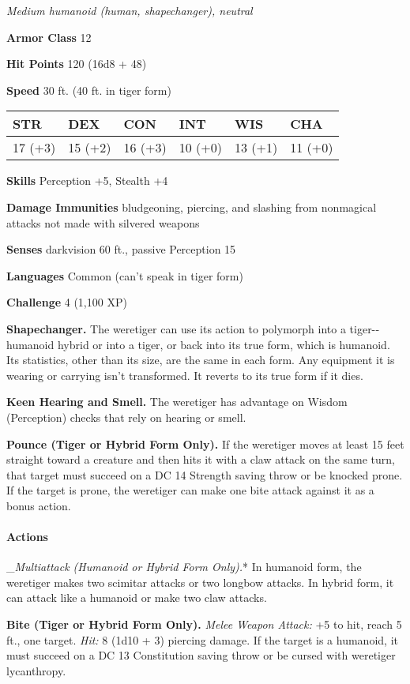 \documentclass[
]{article}
\begin{document}
\emph{Medium humanoid (human, shapechanger), neutral}

\textbf{Armor Class} 12

\textbf{Hit Points} 120 (16d8 + 48)

\textbf{Speed} 30 ft. (40 ft. in tiger form)

\begin{longtable}[]{@{}llllll@{}}
\toprule
STR & DEX & CON & INT & WIS & CHA\tabularnewline
\midrule
\endhead
17 (+3) & 15 (+2) & 16 (+3) & 10 (+0) & 13 (+1) & 11 (+0)\tabularnewline
\bottomrule
\end{longtable}

\textbf{Skills} Perception +5, Stealth +4

\textbf{Damage Immunities} bludgeoning, piercing, and slashing from
nonmagical attacks not made with silvered weapons

\textbf{Senses} darkvision 60 ft., passive Perception 15

\textbf{Languages} Common (can't speak in tiger form)

\textbf{Challenge} 4 (1,100 XP)

\textbf{Shapechanger.} The weretiger can use its action to polymorph
into a tiger-­‐humanoid hybrid or into a tiger, or back into its true
form, which is humanoid. Its statistics, other than its size, are the
same in each form. Any equipment it is wearing or carrying isn't
transformed. It reverts to its true form if it dies.

\textbf{Keen Hearing and Smell.} The weretiger has advantage on Wisdom
(Perception) checks that rely on hearing or smell.

\textbf{Pounce (Tiger or Hybrid Form Only).} If the weretiger moves at
least 15 feet straight toward a creature and then hits it with a claw
attack on the same turn, that target must succeed on a DC 14 Strength
saving throw or be knocked prone. If the target is prone, the weretiger
can make one bite attack against it as a bonus action.

\hypertarget{actions-6}{%
\paragraph{Actions}\label{actions-6}}

\_\emph{Multiattack (Humanoid or Hybrid Form Only).}* In humanoid form,
the weretiger makes two scimitar attacks or two longbow attacks. In
hybrid form, it can attack like a humanoid or make two claw attacks.

\textbf{Bite (Tiger or Hybrid Form Only).} \emph{Melee Weapon Attack:}
+5 to hit, reach 5 ft., one target. \emph{Hit:} 8 (1d10 + 3) piercing
damage. If the target is a humanoid, it must succeed on a DC 13
Constitution saving throw or be cursed with weretiger lycanthropy.
\end{document}
